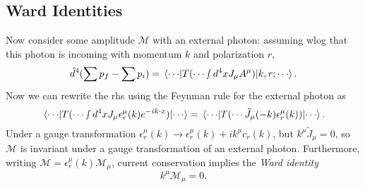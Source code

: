\documentclass{article}
\numberwithin{equation}{section}
\begin{document}
\subsection{Ward Identities}

Now consider some amplitude $\mathcal{M}$ with an external photon: assuming wlog that this photon is incoming with momentum $k$ and polarization $r$,
\begin{equation}
    \hat{d}^4(\sum p_f - \sum p_i)  = \mel{\cdots}{T( \cdots \smallint d^4x J_\mu A^\mu)}{k, r;\cdots}.
\end{equation}
Now we can rewrite the rhs using the Feynman rule for the external photon as 
\begin{equation}
    \mel{\cdots}{T(\cdots \smallint d^4x J_\mu \epsilon_r^\mu(k) e^{-ik\cdot x})}{\cdots} = \ev{T(\cdots \tilde{J}_\mu(-k) \epsilon_r^\mu(k))}{\cdots }.
\end{equation}
Under a gauge transformation $\epsilon_r^\mu(k) \rightarrow \epsilon_r^\mu(k) + ik^\mu c_r(k)$, but $k^\mu \tilde{J}_\mu = 0$, so $\mathcal{M}$ is invariant under a gauge transformation of an external photon. Furthermore, writing $\mathcal{M} = \epsilon_r^\mu(k)\mathcal{M}_\mu$, current conservation implies the \textit{Ward identity}
\begin{equation}
    k^\mu \mathcal{M}_\mu = 0.
\end{equation}
\end{document}
